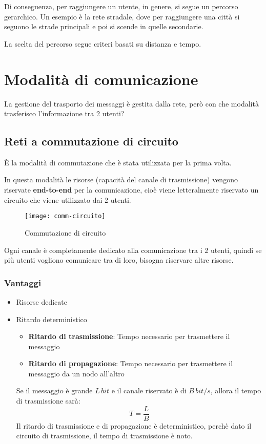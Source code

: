 \documentclass[a4paper]{article}
\begin{document}
\noindent
Di conseguenza, per raggiungere un utente, in genere, si segue un percorso gerarchico.
Un esempio è la rete stradale, dove per raggiungere una città si seguono le strade
principali e poi si scende in quelle secondarie.

\noindent
La scelta del percorso segue criteri basati su distanza e tempo.

\section{Modalità di comunicazione}
La gestione del trasporto dei messaggi è gestita dalla rete, però con che modalità
trasferisco l'informazione tra 2 utenti?

\subsection{Reti a commutazione di circuito}
È la modalità di commutazione che è stata utilizzata per la prima volta.

\noindent
In questa modalità le risorse (capacità del canale di trasmissione) vengono riservate \textbf{end-to-end}
per la comunicazione, cioè viene letteralmente riservato un circuito che viene
utilizzato dai 2 utenti.
\begin{figure}[H]
  \centering
  \texttt{[image: comm-circuito]}
  \caption{Commutazione di circuito}
\end{figure}

\noindent
Ogni canale è completamente dedicato alla comunicazione tra i 2 utenti, quindi
se più utenti vogliono comunicare tra di loro, bisogna riservare altre risorse.

\subsubsection{Vantaggi}
\begin{itemize}
  \item Risorse dedicate
  \item Ritardo deterministico

    \noindent
    \begin{itemize}
      \begin{figure}[H]
        \centering
        \texttt{[image: ritardo]}
        \caption{Ritardo}
      \end{figure}
      \item \textbf{Ritardo di trasmissione}: Tempo necessario per trasmettere il messaggio
      \item \textbf{Ritardo di propagazione}: Tempo necessario per trasmettere il messaggio
        da un nodo all'altro
    \end{itemize}
    Se il messaggio è grande \( L\,bit \) e il canale riservato è di \( B\,bit/s \),
    allora il tempo di trasmissione sarà:
    \[
    T = \frac{L}{B}
    \] 
    Il ritardo di trasmissione e di propagazione è deterministico, perchè
    dato il circuito di trasmissione, il tempo di trasmissione è noto.
\end{itemize}
\end{document}
